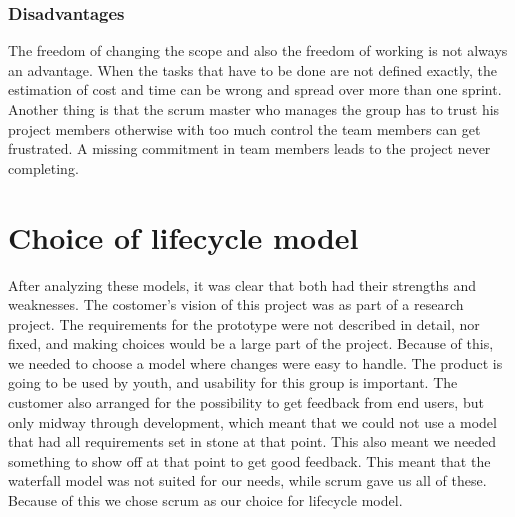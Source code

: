 \subsubsection{Disadvantages}
The freedom of changing the scope and also the freedom of working is not always an advantage. When the tasks that have to be done are not defined exactly, the estimation of cost and time can be wrong and spread over more than one sprint. Another thing is that the scrum master who manages the group has to trust his project members otherwise with too much control the team members can get frustrated. A missing commitment in team members leads to the project never completing.

\section{Choice of lifecycle model}
After analyzing these models, it was clear that both had their strengths and weaknesses. The costomer's vision of this project was as part of a research project. The requirements for the prototype were not described in detail, nor fixed, and making choices would be a large part of the project. Because of this, we needed to choose a model where changes were easy to handle. The product is going to be used by youth, and usability for this group is important. The customer also arranged for the possibility to get feedback from end users, but only midway through development, which meant that we could not use a model that had all requirements set in stone at that point. This also meant we needed something to show off at that point to get good feedback. This meant that the waterfall model was not suited for our needs, while scrum gave us all of these. Because of this we chose scrum as our choice for lifecycle model.